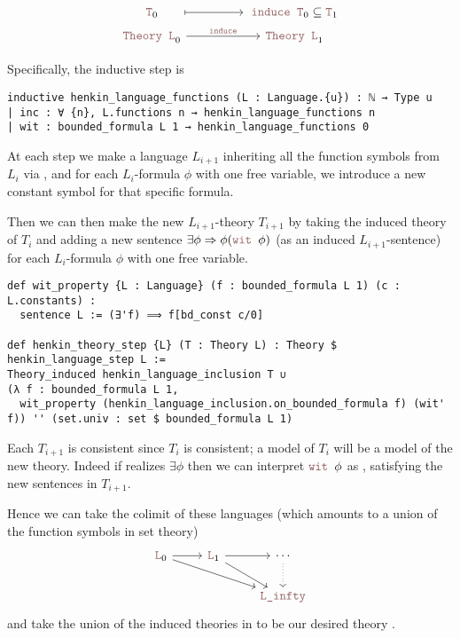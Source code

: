 \[\begin{tikzcd}[row sep = tiny]
	{\code{T}_0} && {\code{induce T}_0 \subs \code{T}_1} \\
	{\code{Theory L}_0} && {\code{Theory L}_1}
	\arrow["{\code{induce}}", from=2-1, to=2-3]
	\arrow[shorten <=17pt, shorten >=2pt, maps to, from=1-1, to=1-3]
\end{tikzcd}\]

Specifically, the inductive step is
\begin{lstlisting}
inductive henkin_language_functions (L : Language.{u}) : ℕ → Type u
| inc : ∀ {n}, L.functions n → henkin_language_functions n
| wit : bounded_formula L 1 → henkin_language_functions 0 \end{lstlisting}
At each step we make a language $L_{i+1}$
inheriting all the function symbols from $L_{i}$ via ,
and for each $L_{i}$-formula $\phi$ with one free variable, we introduce a
new constant symbol  for that specific formula.

Then we can then make the new $L_{i+1}$-theory $T_{i+1}$ by taking the induced theory of
$T_{i}$ and adding a new sentence $\exists \phi \implies \phi(\code{wit } \phi)$
(as an induced $L_{i+1}$-sentence) for each $L_{i}$-formula $\phi$ with one free variable.

\begin{lstlisting}
def wit_property {L : Language} (f : bounded_formula L 1) (c : L.constants) :
  sentence L := (∃'f) ⟹ f[bd_const c/0]

def henkin_theory_step {L} (T : Theory L) : Theory $ henkin_language_step L :=
Theory_induced henkin_language_inclusion T ∪
(λ f : bounded_formula L 1,
  wit_property (henkin_language_inclusion.on_bounded_formula f) (wit' f)) '' (set.univ : set $ bounded_formula L 1)
\end{lstlisting}

Each $T_{i+1}$ is consistent since $T_{i}$ is consistent;
a model of $T_{i}$ will be a model of the new theory.
Indeed if  realizes $\exists \phi$
then we can interpret $\code{wit } \phi$ as ,
satisfying the new sentences in $T_{i+1}$.

Hence we can take the colimit of these languages 
(which amounts to a union of the function symbols in set theory)
\[\begin{tikzcd}
	{\code{L}_0} & {\code{L}_1} & \cdots \\
	&& {\code{L\_infty}}
	\arrow[from=1-1, to=1-2]
	\arrow[from=1-2, to=1-3]
	\arrow[from=1-1, to=2-3]
	\arrow[from=1-2, to=2-3]
	\arrow[dotted, from=1-3, to=2-3]
\end{tikzcd}\]
and take the union of the induced theories in 
to be our desired theory .

